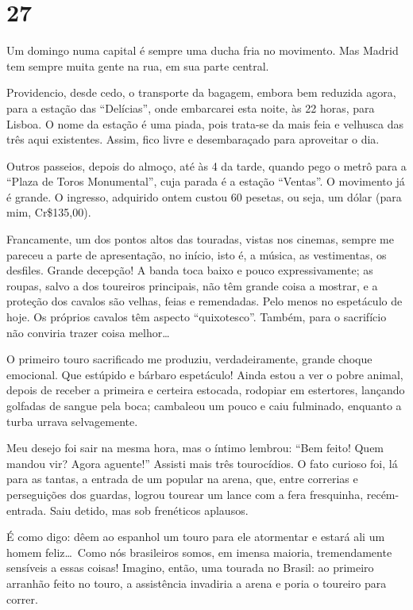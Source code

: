 \section*{27 \adfflatleafright {}}
Um domingo numa capital é sempre uma ducha fria no movimento. Mas Madrid tem sempre muita gente na rua, em sua parte central.

Providencio, desde cedo, o transporte da bagagem, embora bem reduzida agora, para a estação das ``Delícias'', onde embarcarei esta noite, às 22 horas, para Lisboa. O nome da estação é uma piada, pois trata-se da mais feia e velhusca das três aqui existentes. Assim, fico livre e desembaraçado para aproveitar o dia.

Outros passeios, depois do almoço, até às 4 da tarde, quando pego o metrô para a ``Plaza de Toros Monumental'', cuja parada é a estação ``Ventas''. O movimento já é grande. O ingresso, adquirido ontem custou 60 pesetas, ou seja, um dólar (para mim, Cr\$135,00).

Francamente, um dos pontos altos das touradas, vistas nos cinemas, sempre me pareceu a parte de apresentação, no início, isto é, a música, as vestimentas, os desfiles. Grande decepção! A banda toca baixo e pouco expressivamente; as roupas, salvo a dos toureiros principais, não têm grande coisa a mostrar, e a proteção dos cavalos são velhas, feias e remendadas. Pelo menos no espetáculo de hoje. Os próprios cavalos têm aspecto ``quixotesco''. Também, para o sacrifício não conviria trazer coisa melhor\ldots

O primeiro touro sacrificado me produziu, verdadeiramente, grande choque emocional. Que estúpido e bárbaro espetáculo! Ainda estou a ver o pobre animal, depois de receber a primeira e certeira estocada, rodopiar em estertores, lançando golfadas de sangue pela boca; cambaleou um pouco e caiu fulminado, enquanto a turba urrava selvagemente.

Meu desejo foi sair na mesma hora, mas o íntimo lembrou: ``Bem feito! Quem mandou vir? Agora aguente!'' Assisti mais três tourocídios. O fato curioso foi, lá para as tantas, a entrada de um popular na arena, que, entre correrias e perseguições dos guardas, logrou tourear um lance com a fera fresquinha, recém-entrada. Saiu detido, mas sob frenéticos aplausos.

É como digo: dêem ao espanhol um touro para ele atormentar e estará ali um homem feliz\ldots\ Como nós brasileiros somos, em imensa maioria, tremendamente sensíveis a essas coisas! Imagino, então, uma tourada no Brasil: ao primeiro arranhão feito no touro, a assistência invadiria a arena e poria o toureiro para correr.

